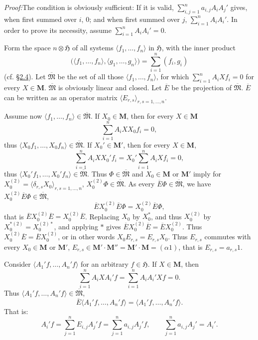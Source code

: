 \documentclass[12pt,b5paper,twoside]{article}
\newcommand{\Hspace}{\mathfrak H}
\newcommand{\M}{\mathbf M}
\newcommand{\Proof}{\par\noindent\textit{Proof:}\enspace}
\newcommand{\secref}[1]{\hyperref[sec:#1]{\S#1}}
\begin{document}
\Proof The condition is obviously sufficient: If it is valid,
$\sum_{i,j=1}^n a_{i,j}A_iA_j'$ gives, when first summed over $i$, $0$; and
when first summed over $j$, $\sum_{i=1}^n A_iA_i'$. In order to prove its
necessity, assume $\sum_{i=1}^n A_iA_i'=0$.

Form the space $n\otimes\Hspace$ of all systems
$\langle f_1,\ldots,f_n\rangle$ in $\Hspace$, with the inner product
\[
 \bigl(\langle f_1,\ldots,f_n\rangle,
       \langle g_1,\ldots,g_n\rangle\bigr)
 =\sum_{i=1}^n(f_i,g_i)
\]
(cf. \secref{2.4}). Let $\overline{\mathfrak M}$ be the set of all those
$\langle f_1,\ldots,f_n\rangle$, for which
$\sum_{i=1}^n A_iXf_i=0$ for every $X\in\M$.
$\overline{\mathfrak M}$ is obviously linear and closed. Let $\overline E$ be
the projection of $\overline{\mathfrak M}$. $\overline E$ can be written as an
operator matrix $\langle E_{r,s}\rangle_{r,s=1,\ldots,n}$.

Assume now $\langle f_1,\ldots,f_n\rangle\in\overline{\mathfrak M}$. If
$X_0\in\M$, then for every $X\in\M$
\[
 \sum_{i=1}^n A_iXX_0f_i=0,
\]
thus $\langle X_0f_1,\ldots,X_0f_n\rangle\in\overline{\mathfrak M}$. If
$X_0'\in\M'$, then for every $X\in\M$,
\[
 \sum_{i=1}^n A_iXX_0'f_i
 =X_0'\sum_{i=1}^n A_iXf_i=0,
\]
thus $\langle X_0'f_1,\ldots,X_0'f_n\rangle\in\overline{\mathfrak M}$.
Thus $\Phi\in\overline{\mathfrak M}$ and $X_0\in\M$ or $\M'$ imply for
$X_0^{(2)}=\langle\delta_{r,s}X_0\rangle_{r,s=1,\ldots,n}$,
$X_0^{(2)}\Phi\in\overline{\mathfrak M}$. As every
$\overline E\Phi\in\overline{\mathfrak M}$, we have
$X_0^{(2)}\overline E\Phi\in\overline{\mathfrak M}$,
\[
 \overline E X_0^{(2)}\overline E\Phi=X_0^{(2)}\overline E\Phi,
\]
that is $\overline E X_0^{(2)}\overline E=X_0^{(2)}\overline E$.
Replacing $X_0$ by $X_0^*$, and thus $X_0^{(2)}$ by
$X_0^{*(2)}=X_0^{(2)*}$, and applying $*$ gives
$\overline E X_0^{(2)}\overline E=\overline E X_0^{(2)}$. Thus
$X_0^{(2)}\overline E=\overline E X_0^{(2)}$, or in other words
$X_0E_{r,s}=E_{r,s}X_0$. Thus $E_{r,s}$ commutes with every $X_0\in\M$ or
$\M'$, $E_{r,s}\in\M'\cdot\M''=\M'\cdot\M=(\alpha1)$, that is
$E_{r,s}=a_{r,s}1$.

Consider $\langle A_1'f,\ldots,A_n'f\rangle$ for an arbitrary
$f\in\Hspace$. If $X\in\M$, then
\[
 \sum_{i=1}^n A_iXA_i'f
 =\sum_{i=1}^n A_iA_i'Xf=0.
\]
Thus $\langle A_1'f,\ldots,A_n'f\rangle\in\overline{\mathfrak M}$,
\[
 \overline E\langle A_1'f,\ldots,A_n'f\rangle
 =\langle A_1'f,\ldots,A_n'f\rangle.
\]
That is:
\[
 A_i'f=\sum_{j=1}^n E_{i,j}A_j'f
 =\sum_{j=1}^n a_{i,j}A_j'f,
 \qquad
 \sum_{j=1}^n a_{i,j}A_j'=A_i'.
\]
\end{document}

